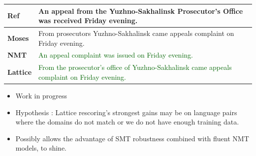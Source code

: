 \documentclass[landscape]{jhuslides3C}
\begin{document}
\vspace{10mm}
\begin{center}
\begin{tabular}{|p{3cm}|p{20cm}|}
\textbf{Ref} & An appeal from the Yuzhno-Sakhalinsk Prosecutor's Office was received Friday evening.\\[1cm] \hline \hline
\textbf{Moses} & \textcolor{verydarkorange}{From prosecutors Yuzhno-Sakhalinsk came appeals complaint on Friday evening.}\\[1cm] \hline \hline
\textbf{NMT} & \textcolor{darkgreen}{An appeal complaint was issued on Friday evening.}\\[1cm] \hline \hline
\textbf{Lattice} & \textcolor{darkgreen}{From the prosecutor's office of Yuzhno-Sakhalinsk came appeals complaint on Friday evening.}
\end{tabular}
\end{center}

\begin{itemize}
\item Work in progress
\item Hypothesis : Lattice rescoring's strongest gains may be on language pairs where the domains do not match or we do not have enough training data.
\item Possibly allows the advantage of SMT robustness combined with fluent NMT models, to shine. 
\end{itemize}
\end{document}
